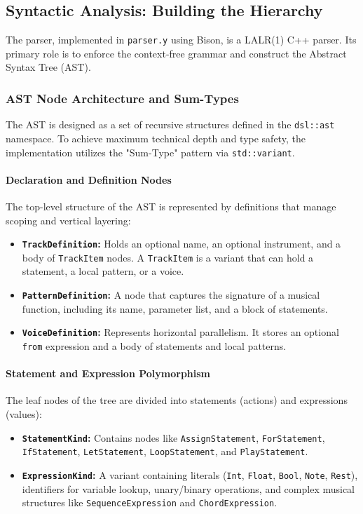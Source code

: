 \subsection{Syntactic Analysis: Building the Hierarchy}

The parser, implemented in \texttt{parser.y} using Bison, is a LALR(1) C++ parser.
Its primary role is to enforce the context-free grammar and construct the Abstract Syntax Tree (AST).

\subsubsection{AST Node Architecture and Sum-Types}

The AST is designed as a set of recursive structures defined in the \texttt{dsl::ast} namespace.
To achieve maximum technical depth and type safety, the implementation utilizes the "Sum-Type" pattern via
\texttt{std::variant}.

\paragraph{Declaration and Definition Nodes}
The top-level structure of the AST is represented by definitions that manage scoping and vertical layering:
\begin{itemize}
  \item \textbf{\texttt{TrackDefinition}:} Holds an optional name, an optional instrument, and a body of
    \texttt{TrackItem} nodes. A \texttt{TrackItem} is a variant that can hold a statement, a local pattern, or a voice.
  \item \textbf{\texttt{PatternDefinition}:} A node that captures the signature of a musical function,
    including its name, parameter list, and a block of statements.
  \item \textbf{\texttt{VoiceDefinition}:} Represents horizontal parallelism. It stores an optional
    \texttt{from} expression and a body of statements and local patterns.
\end{itemize}

\paragraph{Statement and Expression Polymorphism}
The leaf nodes of the tree are divided into statements (actions) and expressions (values):
\begin{itemize}
  \item \textbf{\texttt{StatementKind}:} Contains nodes like \texttt{AssignStatement}, \texttt{ForStatement},
    \texttt{IfStatement}, \texttt{LetStatement}, \texttt{LoopStatement}, and \texttt{PlayStatement}.
  \item \textbf{\texttt{ExpressionKind}:} A variant containing literals (\texttt{Int}, \texttt{Float},
    \texttt{Bool}, \texttt{Note}, \texttt{Rest}), identifiers for variable lookup, unary/binary operations,
    and complex musical structures like \texttt{SequenceExpression} and \texttt{ChordExpression}.
\end{itemize}

